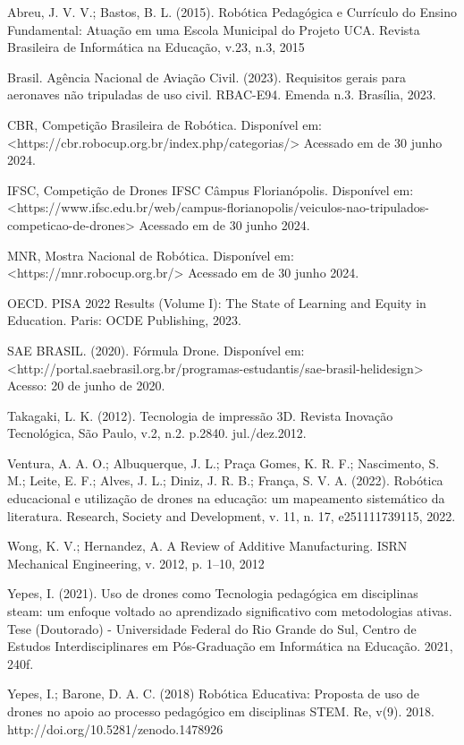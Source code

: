 \documentclass[conference]{IEEEtran}
\begin{document}
\begin{thebibliography}{00}
 Abreu, J. V. V.; Bastos, B. L. (2015). Robótica Pedagógica e Currículo do Ensino Fundamental: Atuação em uma Escola Municipal do Projeto UCA. Revista Brasileira de Informática na Educação, v.23, n.3, 2015

 Brasil. Agência Nacional de Aviação Civil. (2023). Requisitos gerais para aeronaves não tripuladas de uso civil. RBAC-E94. Emenda n.3. Brasília, 2023.

 CBR, Competição Brasileira de Robótica. Disponível em: <https://cbr.robocup.org.br/index.php/categorias/> Acessado em de 30 junho 2024.

 IFSC, Competição de Drones IFSC Câmpus Florianópolis. Disponível em: <https://www.ifsc.edu.br/web/campus-florianopolis/veiculos-nao-tripulados-competicao-de-drones> Acessado em de 30 junho 2024.

 MNR, Mostra Nacional de Robótica. Disponível em: <https://mnr.robocup.org.br/> Acessado em de 30 junho 2024.

 OECD. PISA 2022 Results (Volume I): The State of Learning and Equity in Education. Paris: OCDE Publishing, 2023.

 SAE BRASIL. (2020). Fórmula Drone. Disponível em: <http://portal.saebrasil.org.br/programas-estudantis/sae-brasil-helidesign> Acesso: 20 de junho de 2020.

 Takagaki, L. K. (2012). Tecnologia de impressão 3D. Revista Inovação Tecnológica, São Paulo, v.2, n.2. p.2840. jul./dez.2012. 

 Ventura, A. A. O.; Albuquerque, J. L.; Praça Gomes, K. R. F.; Nascimento, S. M.; Leite, E. F.; Alves, J. L.; Diniz, J. R. B.; França, S. V. A. (2022). Robótica educacional e utilização de drones na educação: um mapeamento sistemático da literatura. Research, Society and Development, v. 11, n. 17, e251111739115, 2022.

 Wong, K. V.; Hernandez, A. A Review of Additive Manufacturing. ISRN Mechanical Engineering, v. 2012, p. 1–10, 2012

 Yepes, I. (2021). Uso de drones como Tecnologia pedagógica em disciplinas steam: um enfoque voltado ao aprendizado significativo com metodologias ativas. Tese (Doutorado) - Universidade Federal do Rio Grande do Sul, Centro de Estudos Interdisciplinares em Pós-Graduação em Informática na Educação. 2021, 240f. 

 Yepes, I.; Barone, D. A. C. (2018) Robótica Educativa: Proposta de uso de drones no apoio ao processo pedagógico em disciplinas STEM. Re, v(9). 2018. http://doi.org/10.5281/zenodo.1478926

\end{thebibliography}
\end{document}
